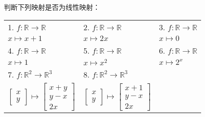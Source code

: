 	\begin{exercise}[1.1.5]
		判断下列映射是否为线性映射：
		\begin{table}[htbp]
			\centering
			\begin{tabular}{p{0.3\textwidth}p{}p{}}
				1. $f: \mathbb{R}\rightarrow\mathbb{R}$&2. $f: \mathbb{R}\rightarrow\mathbb{R}$&3. $f: \mathbb{R}\rightarrow\mathbb{R}$\\
				\hspace{3em}$x\mapsto x+1$&\hspace{3em}$x\mapsto 2x$&\hspace{3em}$x\mapsto 0$\\
				4. $f: \mathbb{R}\rightarrow\mathbb{R}$&5. $f: \mathbb{R}\rightarrow\mathbb{R}$&6. $f: \mathbb{R}\rightarrow\mathbb{R}$\\
				\hspace{3em}$x\mapsto 1$&\hspace{3em}$x\mapsto x^2$&\hspace{3em}$x\mapsto 2^{x}$\\
				7. $f:\mathbb{R}^{2}\rightarrow\mathbb{R}^{3}$&8. $f:\mathbb{R}^{2}\rightarrow\mathbb{R}^{3}$&\\
				\hspace{3em}$\begin{bmatrix}
					x\\y
				\end{bmatrix}\mapsto\begin{bmatrix}
					x+y\\y-x\\2x
				\end{bmatrix}$&\hspace{3em}$\begin{bmatrix}
					x\\y
				\end{bmatrix}\mapsto\begin{bmatrix}
					x+1\\y-x\\2x
				\end{bmatrix}$&
			\end{tabular}
		\end{table}
	\end{exercise}
